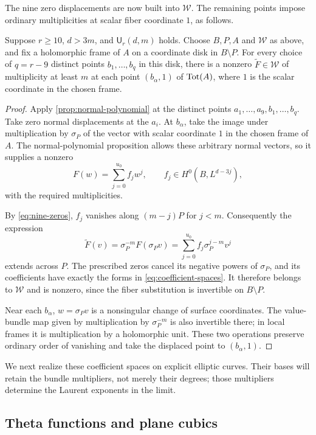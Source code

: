 The nine zero displacements are now built into $\mathcal{W}$. The remaining points impose ordinary multiplicities at scalar fiber coordinate $1$, as follows.

\begin{proposition}
\label{prop:necessary-W}
Suppose $r\geq10$, $d>3m$, and $\mathsf U_r(d,m)$ holds. Choose $B,P,A$ and $\mathcal{W}$ as above, and fix a holomorphic frame of $A$ on a coordinate disk in $B\setminus P$. For every choice of $q=r-9$ distinct points $b_1,\ldots,b_q$ in this disk, there is a nonzero $\widetilde F\in\mathcal{W}$ of multiplicity at least $m$ at each point $(b_\alpha,1)$ of $\operatorname{Tot}(A)$, where $1$ is the scalar coordinate in the chosen frame.
\end{proposition}

\begin{proof}
Apply \cref{prop:normal-polynomial} at the distinct points $a_1,\ldots,a_9,b_1,\ldots,b_q$. Take zero normal displacements at the $a_i$. At $b_\alpha$, take the image under multiplication by $\sigma_P$ of the vector with scalar coordinate $1$ in the chosen frame of $A$. The normal-polynomial proposition allows these arbitrary normal vectors, so it supplies a nonzero
\[
 F(w)=\sum_{j=0}^{u_0}f_jw^j,\qquad
 f_j\in H^0(B,L^{d-3j}),
\]
with the required multiplicities.

By \eqref{eq:nine-zeros}, $f_j$ vanishes along $(m-j)P$ for $j<m$. Consequently the expression
\[
 \widetilde F(v)=\sigma_P^{-m}F(\sigma_P v)
       =\sum_{j=0}^{u_0}f_j\sigma_P^{j-m}v^j
\]
extends across $P$. The prescribed zeros cancel its negative powers of $\sigma_P$, and its coefficients have exactly the forms in \eqref{eq:coefficient-spaces}. It therefore belongs to $\mathcal{W}$ and is nonzero, since the fiber substitution is invertible on $B\setminus P$.

Near each $b_\alpha$, $w=\sigma_P v$ is a nonsingular change of surface coordinates. The value-bundle map given by multiplication by $\sigma_P^{-m}$ is also invertible there; in local frames it is multiplication by a holomorphic unit. These two operations preserve ordinary order of vanishing and take the displaced point to $(b_\alpha,1)$.
\end{proof}

We next realize these coefficient spaces on explicit elliptic curves. Their bases will retain the bundle multipliers, not merely their degrees; those multipliers determine the Laurent exponents in the limit.

\subsection{Theta functions and plane cubics}

